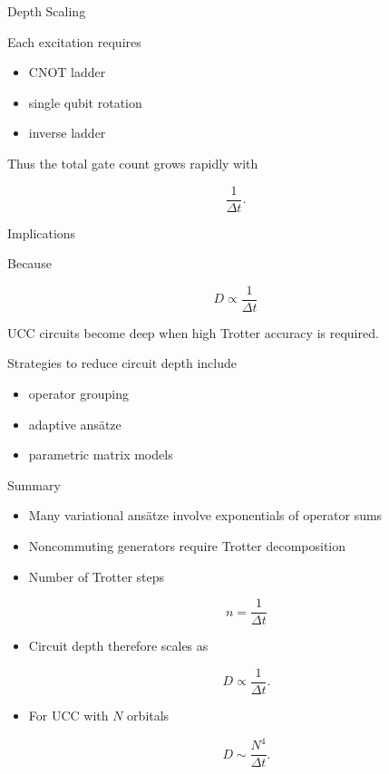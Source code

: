 \documentclass{beamer}
\begin{document}
\begin{frame}{Depth Scaling}

Each excitation requires

\begin{itemize}
\item CNOT ladder
\item single qubit rotation
\item inverse ladder
\end{itemize}

Thus the total gate count grows rapidly with

\[
\frac{1}{\Delta t}.
\]

\end{frame}

\begin{frame}{Implications}

Because

\[
D \propto \frac{1}{\Delta t}
\]

UCC circuits become deep when high Trotter accuracy is required.

Strategies to reduce circuit depth include

\begin{itemize}
\item operator grouping
\item adaptive ansätze
\item parametric matrix models
\end{itemize}

\end{frame}

\begin{frame}{Summary}

\begin{itemize}
\item Many variational ansätze involve exponentials of operator sums
\item Noncommuting generators require Trotter decomposition
\item Number of Trotter steps

\[
n = \frac{1}{\Delta t}
\]

\item Circuit depth therefore scales as

\[
D \propto \frac{1}{\Delta t}.
\]

\item For UCC with $N$ orbitals

\[
D \sim \frac{N^4}{\Delta t}.
\]

\end{itemize}

\end{frame}
\end{document}
